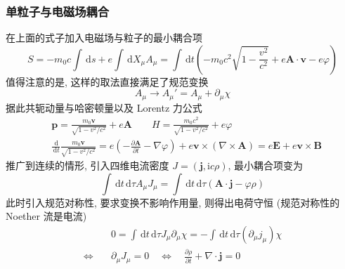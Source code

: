 \documentclass[12pt,a4paper]{article}%
\numberwithin{equation}{section}%
\renewcommand*{\vec}[1]{\bm{#1}}%
\newcommand{\dif}{\,\mathrm d}
\newcommand\mi{\mathrm{i}}
\begin{document}
\subsubsection{单粒子与电磁场耦合} %
\label{ssub:single_particle_with_EMF}
在上面的式子加入电磁场与粒子的最小耦合项
\begin{equation}
    S = -m_0c\int\dif s + e\int\dif X_\mu A_\mu 
    = \int\dif t\left(-m_0 c^2\sqrt{1-\frac{v^2}{c^2}} + e\vec A\cdot\vec v - e\varphi\right)
\end{equation}
值得注意的是, 这样的取法直接满足了规范变换
\begin{equation}
    A_\mu\to A_\mu' = A_\mu + \partial_\mu \chi
\end{equation}
据此共轭动量与哈密顿量以及 Lorentz 力公式
\begin{align}
    &\vec p = \frac{m_0\vec v}{\sqrt{1-v^2/c^2}} + e\vec A\qquad
    H = \frac{m_0 c^2}{\sqrt{1-v^2/c^2}} + e\varphi \\
    &\frac{\dif}{\dif t}\frac{m_0\vec v}{\sqrt{1-v^2/c^2}} 
    = e(-\frac{\partial\vec A}{\partial t} - \nabla\varphi) + e\vec v\times(\nabla\times\vec A) = e\vec E + e\vec v\times\vec B
\end{align}
推广到连续的情形, 引入四维电流密度 $J = (\vec j, \mi c\rho)$, 最小耦合项变为
\begin{equation}
    \int\dif t\dif \tau A_\mu J_\mu = \int\dif t\dif \tau (\vec A\cdot\vec j - \varphi\rho)
\end{equation}
此时引入规范对称性, 要求变换不影响作用量, 则得出电荷守恒 (规范对称性的 Noether 流是电流)
\begin{align}
    &0 = \int\dif t\dif \tau J_\mu\partial_\mu\chi = -\int\dif t\dif\tau(\partial_\mu j_\mu)\chi \\
    \Longleftrightarrow\quad& \partial_\mu J_\mu = 0 \quad\Leftrightarrow\quad \frac{\partial\rho}{\partial t} + \nabla\cdot\vec j = 0
\end{align} 
\end{document}
